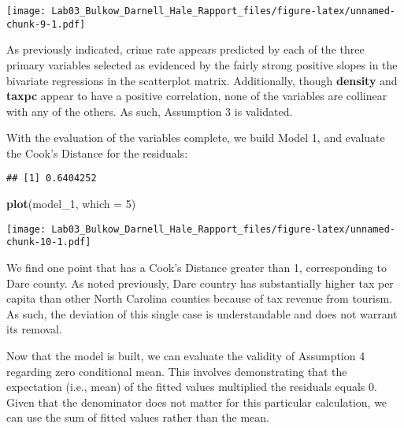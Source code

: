 \documentclass[]{article}
\newenvironment{Shaded}{\begin{snugshade}}{\end{snugshade}}
\newcommand{\KeywordTok}[1]{\textcolor[rgb]{0.13,0.29,0.53}{\textbf{#1}}}
\newcommand{\DataTypeTok}[1]{\textcolor[rgb]{0.13,0.29,0.53}{#1}}
\newcommand{\DecValTok}[1]{\textcolor[rgb]{0.00,0.00,0.81}{#1}}
\newcommand{\StringTok}[1]{\textcolor[rgb]{0.31,0.60,0.02}{#1}}
\newcommand{\CommentTok}[1]{\textcolor[rgb]{0.56,0.35,0.01}{\textit{#1}}}
\newcommand{\OperatorTok}[1]{\textcolor[rgb]{0.81,0.36,0.00}{\textbf{#1}}}
\newcommand{\NormalTok}[1]{#1}
\begin{document}
\texttt{[image: Lab03\_Bulkow\_Darnell\_Hale\_Rapport\_files/figure-latex/unnamed-chunk-9-1.pdf]}

As previously indicated, crime rate appears predicted by each of the
three primary variables selected as evidenced by the fairly strong
positive slopes in the bivariate regressions in the scatterplot matrix.
Additionally, though \textbf{density} and \textbf{taxpc} appear to have
a positive correlation, none of the variables are collinear with any of
the others. As such, Assumption 3 is validated.

With the evaluation of the variables complete, we build Model 1, and
evaluate the Cook's Distance for the residuals:

\begin{Shaded}
\end{Shaded}

\begin{verbatim}
## [1] 0.6404252
\end{verbatim}

\begin{Shaded}
\begin{Highlighting}[]
\KeywordTok{plot}\NormalTok{(model_}\DecValTok{1}\NormalTok{, }\DataTypeTok{which =} \DecValTok{5}\NormalTok{)}
\end{Highlighting}
\end{Shaded}

\texttt{[image: Lab03\_Bulkow\_Darnell\_Hale\_Rapport\_files/figure-latex/unnamed-chunk-10-1.pdf]}

We find one point that has a Cook's Distance greater than 1,
corresponding to Dare county. As noted previously, Dare country has
substantially higher tax per capita than other North Carolina counties
because of tax revenue from tourism. As such, the deviation of this
single case is understandable and does not warrant its removal.

Now that the model is built, we can evaluate the validity of Assumption
4 regarding zero conditional mean. This involves demonstrating that the
expectation (i.e., mean) of the fitted values multiplied the residuals
equals 0. Given that the denominator does not matter for this particular
calculation, we can use the sum of fitted values rather than the mean.
\end{document}
